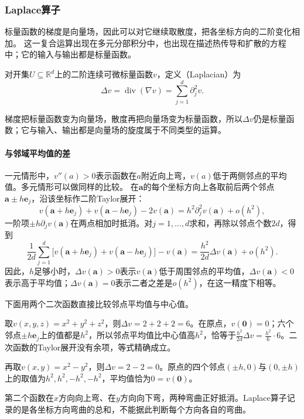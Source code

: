 \subsubsection{Laplace算子}

标量函数的梯度是向量场，因此可以对它继续取散度，把各坐标方向的二阶变化相加。
这一复合运算出现在多元分部积分中，也出现在描述热传导和扩散的方程中；它的输入与输出都是标量函数。
\begin{definition}[Laplace算子]
\label{def:multivariable-laplacian}
对开集$U\subseteq\mathbb R^d$上的二阶连续可微标量函数$v$，定义（Laplacian）为
\[
 \Delta v=\operatorname{div}(\nabla v)
 =\sum_{j=1}^d\partial_j^2v.
\]
\end{definition}
梯度把标量函数变为向量场，散度再把向量场变为标量函数，所以$\Delta v$仍是标量函数；它与输入、输出都是向量场的旋度属于不同类型的运算。

\paragraph{与邻域平均值的差}

一元情形中，$v''(a)>0$表示函数在$a$附近向上弯，$v(a)$低于两侧邻点的平均值。多元情形可以做同样的比较。
在$\bm a$的每个坐标方向上各取前后两个邻点$\bm a\pm h\bm e_j$，沿该坐标作二阶Taylor展开：
\[
 v(\bm a+h\bm e_j)+v(\bm a-h\bm e_j)-2v(\bm a)=h^2\partial_j^2v(\bm a)+o(h^2),
\]
一阶项$\pm h\partial_jv(\bm a)$在两点相加时抵消。对$j=1,\ldots,d$求和，再除以邻点个数$2d$，得到
\[
 \frac1{2d}\sum_{j=1}^d\bigl[v(\bm a+h\bm e_j)+v(\bm a-h\bm e_j)\bigr]-v(\bm a)
 =\frac{h^2}{2d}\Delta v(\bm a)+o(h^2).
\]
因此，$h$足够小时，$\Delta v(\bm a)>0$表示$v(\bm a)$低于周围邻点的平均值，$\Delta v(\bm a)<0$表示高于平均值；$\Delta v(\bm a)=0$表示二者之差是$o(h^2)$，在这一精度下相等。

下面用两个二次函数直接比较邻点平均值与中心值。
\begin{example}[二次函数的邻点平均]
取$v(x,y,z)=x^2+y^2+z^2$，则$\Delta v=2+2+2=6$。在原点，$v(\bm0)=0$；六个邻点$\pm h\bm e_j$上的值都是$h^2$，所以邻点平均值比中心值高$h^2$，恰等于$\frac{h^2}{2d}\Delta v=\frac{h^2}6\cdot6$。二次函数的Taylor展开没有余项，等式精确成立。

再取$v(x,y)=x^2-y^2$，则$\Delta v=2-2=0$。原点的四个邻点$(\pm h,0)$与$(0,\pm h)$上的取值为$h^2,h^2,-h^2,-h^2$，平均值恰为$0=v(\bm0)$。
\end{example}
第二个函数在$x$方向向上弯、在$y$方向向下弯，两种弯曲正好抵消。Laplace算子记录的是各坐标方向弯曲的总和，不能据此判断每个方向各自的弯曲。

